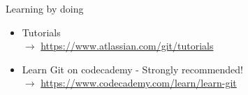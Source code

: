 \documentclass[10pt,xcolor=dvipsnames]{beamer}
\begin{document}
\begin{frame}{Learning by doing}
\begin{itemize}
  \setlength\itemsep{0.4in}
\item Tutorials  \\$\rightarrow$  \url{https://www.atlassian.com/git/tutorials}
\item Learn Git on codecademy - Strongly recommended!\\ $\rightarrow$ \url{https://www.codecademy.com/learn/learn-git}
\end{itemize}
\end{frame}
\end{document}

